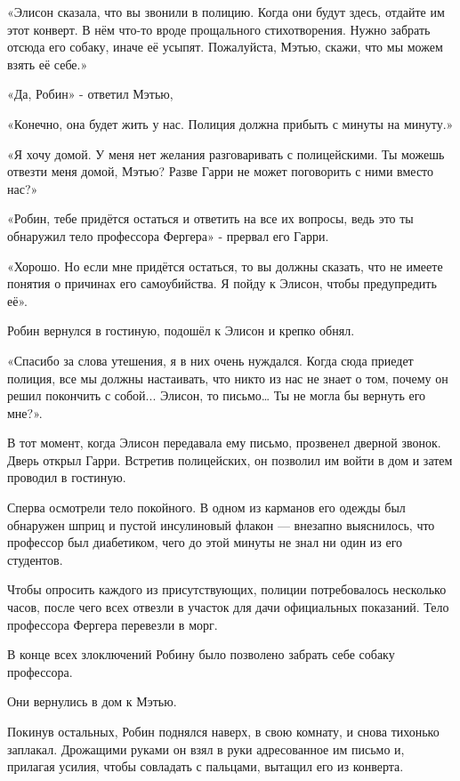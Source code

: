 \documentclass[a4paper,12pt]{book}
\begin{document}
\par
«Элисон сказала, что вы звонили в полицию. Когда они будут здесь, отдайте им этот конверт. В нём что-то вроде прощального стихотворения. Нужно забрать отсюда его собаку, иначе её усыпят. Пожалуйста, Мэтью, скажи, что мы можем взять её себе.»
\par
«Да, Робин» - ответил Мэтью,
\par
«Конечно, она будет жить у нас. Полиция должна прибыть с минуты на минуту.»
\par
«Я хочу домой. У меня нет желания разговаривать с полицейскими. Ты можешь отвезти меня домой, Мэтью? Разве Гарри не может поговорить с ними вместо нас?»
\par
«Робин, тебе придётся остаться и ответить на все их вопросы, ведь это ты обнаружил тело профессора Фергера» - прервал его Гарри.
\par
«Хорошо. Но если мне придётся остаться, то вы должны сказать, что не имеете понятия о причинах его самоубийства. Я пойду к Элисон, чтобы предупредить её».
\par
Робин вернулся в гостиную, подошёл к Элисон и крепко обнял.
\par
«Спасибо за слова утешения, я в них очень нуждался. Когда сюда приедет полиция, все мы должны настаивать, что никто из нас не знает о том, почему он решил покончить с собой... Элисон, то письмо… Ты не могла бы вернуть его мне?».
\par
В тот момент, когда Элисон передавала ему письмо, прозвенел дверной звонок. Дверь открыл Гарри. Встретив полицейских, он позволил им войти в дом и затем проводил в гостиную.
\par
Сперва осмотрели тело покойного. В одном из карманов его одежды был обнаружен шприц и пустой инсулиновый флакон — внезапно выяснилось, что профессор был диабетиком, чего до этой минуты не знал ни один из его студентов.
\par
Чтобы опросить каждого из присутствующих, полиции потребовалось несколько часов, после чего всех отвезли в участок для дачи официальных показаний. Тело профессора Фергера перевезли в морг.
\par
В конце всех злоключений Робину было позволено забрать себе собаку профессора.\\
\par
Они вернулись в дом к Мэтью.
\par
Покинув остальных, Робин поднялся наверх, в свою комнату, и снова тихонько заплакал. Дрожащими руками он взял в руки адресованное им письмо и, прилагая усилия, чтобы совладать с пальцами, вытащил его из конверта.
\end{document}
